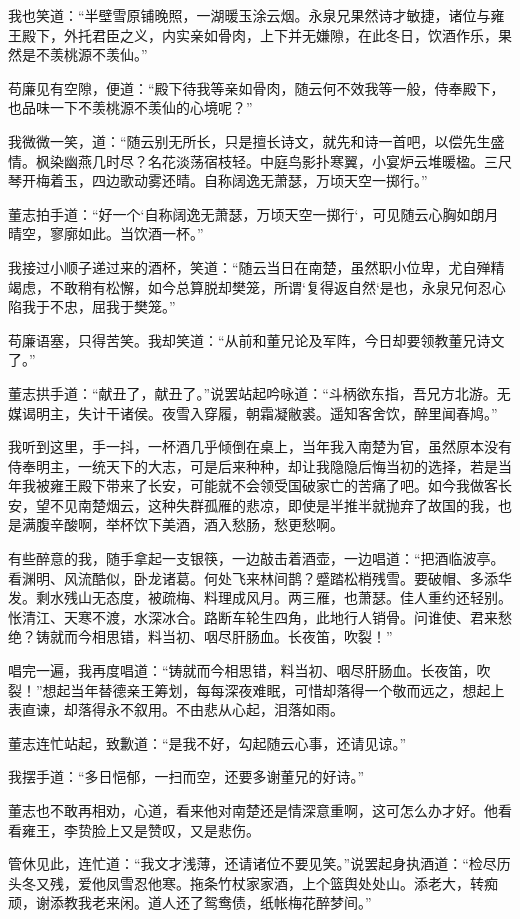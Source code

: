 我也笑道：“半壁雪原铺晚照，一湖暖玉涂云烟。永泉兄果然诗才敏捷，诸位与雍王殿下，外托君臣之义，内实亲如骨肉，上下并无嫌隙，在此冬日，饮酒作乐，果然是不羡桃源不羡仙。”

苟廉见有空隙，便道：“殿下待我等亲如骨肉，随云何不效我等一般，侍奉殿下，也品味一下不羡桃源不羡仙的心境呢？”

我微微一笑，道：“随云别无所长，只是擅长诗文，就先和诗一首吧，以偿先生盛情。枫染幽燕几时尽？名花淡荡宿枝轻。中庭鸟影扑寒翼，小宴炉云堆暖楹。三尺琴开梅着玉，四边歌动雾还晴。自称阔逸无萧瑟，万顷天空一掷行。”

董志拍手道：“好一个‘自称阔逸无萧瑟，万顷天空一掷行‘，可见随云心胸如朗月晴空，寥廓如此。当饮酒一杯。”

我接过小顺子递过来的酒杯，笑道：“随云当日在南楚，虽然职小位卑，尤自殚精竭虑，不敢稍有松懈，如今总算脱却樊笼，所谓‘复得返自然‘是也，永泉兄何忍心陷我于不忠，屈我于樊笼。”

苟廉语塞，只得苦笑。我却笑道：“从前和董兄论及军阵，今日却要领教董兄诗文了。”

董志拱手道：“献丑了，献丑了。”说罢站起吟咏道：“斗柄欲东指，吾兄方北游。无媒谒明主，失计干诸侯。夜雪入穿履，朝霜凝敝裘。遥知客舍饮，醉里闻春鸠。”

我听到这里，手一抖，一杯酒几乎倾倒在桌上，当年我入南楚为官，虽然原本没有侍奉明主，一统天下的大志，可是后来种种，却让我隐隐后悔当初的选择，若是当年我被雍王殿下带来了长安，可能就不会领受国破家亡的苦痛了吧。如今我做客长安，望不见南楚烟云，这种失群孤雁的悲凉，即使是半推半就抛弃了故国的我，也是满腹辛酸啊，举杯饮下美酒，酒入愁肠，愁更愁啊。

有些醉意的我，随手拿起一支银筷，一边敲击着酒壶，一边唱道：“把酒临波亭。看渊明、风流酷似，卧龙诸葛。何处飞来林间鹊？蹙踏松梢残雪。要破帽、多添华发。剩水残山无态度，被疏梅、料理成风月。两三雁，也萧瑟。佳人重约还轻别。怅清江、天寒不渡，水深冰合。路断车轮生四角，此地行人销骨。问谁使、君来愁绝？铸就而今相思错，料当初、咽尽肝肠血。长夜笛，吹裂！”

唱完一遍，我再度唱道：“铸就而今相思错，料当初、咽尽肝肠血。长夜笛，吹裂！”想起当年替德亲王筹划，每每深夜难眠，可惜却落得一个敬而远之，想起上表直谏，却落得永不叙用。不由悲从心起，泪落如雨。

董志连忙站起，致歉道：“是我不好，勾起随云心事，还请见谅。”

我摆手道：“多日悒郁，一扫而空，还要多谢董兄的好诗。”

董志也不敢再相劝，心道，看来他对南楚还是情深意重啊，这可怎么办才好。他看看雍王，李贽脸上又是赞叹，又是悲伤。

管休见此，连忙道：“我文才浅薄，还请诸位不要见笑。”说罢起身执酒道：“检尽历头冬又残，爱他凤雪忍他寒。拖条竹杖家家酒，上个篮舆处处山。添老大，转痴顽，谢添教我老来闲。道人还了鸳鸯债，纸帐梅花醉梦间。”

